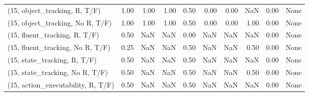 \begin{table*}[h!]
\begin{adjustbox}{width=2\columnwidth,center}
\begin{tabular}{lrrr|rrr|rrr}
\midrule
(15, object\_tracking, R, T/F)         &                      1.00 &                  1.00 &                      1.00 &                          0.50 &                      0.00 &                          0.00 &                                    NaN &                               0.00 &                                  None \\
(15, object\_tracking, No R, T/F)      &                      1.00 &                  1.00 &                      1.00 &                          0.50 &                      0.00 &                          0.00 &                                   1.00 &                               0.00 &                                  None \\
(15, fluent\_tracking, R, T/F)         &                      0.50 &                   NaN &                       NaN &                          0.00 &                       NaN &                           NaN &                                    NaN &                               0.00 &                                  None \\
(15, fluent\_tracking, No R, T/F)      &                      0.25 &                   NaN &                       NaN &                          0.50 &                       NaN &                           NaN &                                   0.50 &                               0.00 &                                  None \\
(15, state\_tracking, R, T/F)          &                      0.50 &                   NaN &                       NaN &                          0.50 &                       NaN &                           NaN &                                    NaN &                               0.00 &                                  None \\
(15, state\_tracking, No R, T/F)       &                      0.50 &                   NaN &                       NaN &                          0.50 &                       NaN &                           NaN &                                   0.50 &                               0.00 &                                  None \\
(15, action\_executability, R, T/F)    &                      0.50 &                   NaN &                       NaN &                          0.50 &                       NaN &                           NaN &                                    NaN &                               0.00 &                                  None \\

\end{tabular}
\end{adjustbox}
\end{table*}
